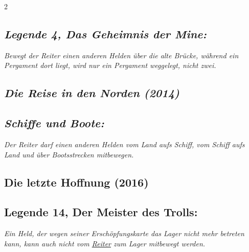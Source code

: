 \documentclass[10pt, a4paper, oneside]{book}
\newcommand{\fan}[1]{\textit{#1}}
\begin{document}
\begin{multicols*}{2}
\begin{bgcolor}
\subsection{\fan{Legende 4, Das Geheimnis der Mine:}}

\fan{Bewegt der Reiter einen anderen Helden über die alte Brücke, während ein Pergament dort liegt, wird nur ein Pergament weggelegt, nicht zwei.}


\end{bgcolor}




\begin{bgcolor}
\section{\fan{Die Reise in den Norden (2014)}}


\subsection{\fan{Schiffe und Boote:}}

\fan{Der Reiter darf einen anderen Helden vom Land aufs Schiff, vom Schiff aufs Land und über Bootsstrecken mitbewegen.}

\end{bgcolor}






\begin{bgcolor}
\section{Die letzte Hoffnung (2016)}





\subsection{Legende 14, Der Meister des Trolls:}

\fan{Ein Held, der wegen seiner Erschöpfungskarte das Lager nicht mehr betreten kann, kann auch nicht vom \hyperref[Reiter]{Reiter} zum Lager mitbewegt werden.}







\end{bgcolor}


\begin{bgcolor}[color-AG]

\end{bgcolor}
\end{multicols*}
\end{document}
